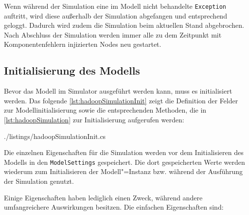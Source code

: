 Wenn während der Simulation eine im Modell nicht behandelte \texttt{Exception} auftritt, wird diese außerhalb der Simulation abgefangen und entsprechend geloggt.
Dadurch wird zudem die Simulation beim aktuellen Stand abgebrochen.
Nach Abschluss der Simulation werden immer alle zu dem Zeitpunkt mit Komponentenfehlern injizierten Nodes neu gestartet.

\subsection{Initialisierung des Modells}
\label{sec:simulationModelInit}

Bevor das Modell im Simulator ausgeführt werden kann, muss es initialisiert werden.
Das folgende \autoref{lst:hadoopSimulationInit} zeigt die Definition der Felder zur Modellinitialisierung sowie die entsprechenden Methoden, die in \autoref{lst:hadoopSimulation} zur Initialisierung aufgerufen werden:


{./listings/hadoopSimulationInit.cs}

Die einzelnen Eigenschaften für die Simulation werden vor dem Initialisieren des Modells in den \texttt{ModelSettings} gespeichert.
Die dort gespeicherten Werte werden wiederum zum Initialisieren der Modell"=Instanz bzw. während der Ausführung der Simulation genutzt.

Einige Eigenschaften haben lediglich einen Zweck, während andere umfangreichere Auswirkungen besitzen.
Die einfachen Eigenschaften sind:

